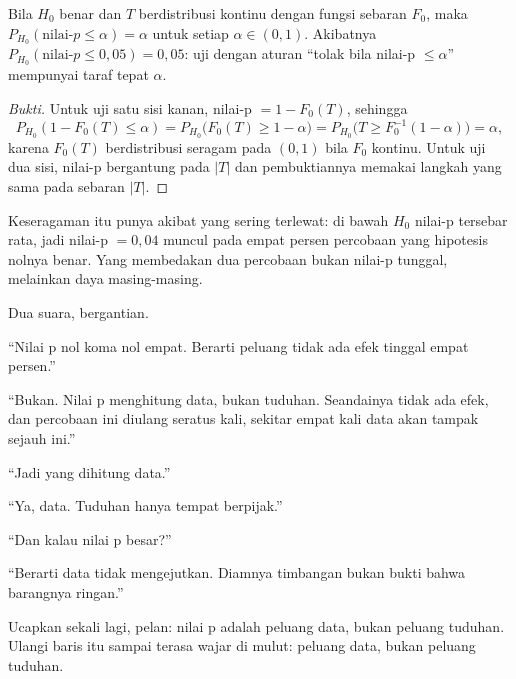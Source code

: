 \begin{teorema}
Bila $H_0$ benar dan $T$ berdistribusi kontinu dengan fungsi sebaran $F_0$, maka
$P_{H_0}(\text{nilai-}p\le\alpha)=\alpha$ untuk setiap $\alpha\in(0,1)$. Akibatnya
$P_{H_0}(\text{nilai-}p\le0{,}05)=0{,}05$: uji dengan aturan ``tolak bila nilai-p
$\le\alpha$'' mempunyai taraf tepat $\alpha$.
\end{teorema}

\begin{proof}[Bukti]
Untuk uji satu sisi kanan, nilai-p $=1-F_0(T)$, sehingga
\[
P_{H_0}(1-F_0(T)\le\alpha)
=P_{H_0}\bigl(F_0(T)\ge1-\alpha\bigr)
=P_{H_0}\bigl(T\ge F_0^{-1}(1-\alpha)\bigr)=\alpha,
\]
karena $F_0(T)$ berdistribusi seragam pada $(0,1)$ bila $F_0$ kontinu. Untuk uji dua
sisi, nilai-p bergantung pada $|T|$ dan pembuktiannya memakai langkah yang sama pada
sebaran $|T|$.
\end{proof}

Keseragaman itu punya akibat yang sering terlewat: di bawah $H_0$ nilai-p tersebar
rata, jadi nilai-p $=0{,}04$ muncul pada empat persen percobaan yang hipotesis nolnya
benar. Yang membedakan dua percobaan bukan nilai-p tunggal, melainkan daya
masing-masing.

\begin{bacakeras}
Dua suara, bergantian.

``Nilai p nol koma nol empat. Berarti peluang tidak ada efek tinggal empat persen.''

``Bukan. Nilai p menghitung data, bukan tuduhan. Seandainya tidak ada efek, dan
percobaan ini diulang seratus kali, sekitar empat kali data akan tampak sejauh ini.''

``Jadi yang dihitung data.''

``Ya, data. Tuduhan hanya tempat berpijak.''

``Dan kalau nilai p besar?''

``Berarti data tidak mengejutkan. Diamnya timbangan bukan bukti bahwa barangnya ringan.''

Ucapkan sekali lagi, pelan: nilai p adalah peluang data, bukan peluang tuduhan. Ulangi
baris itu sampai terasa wajar di mulut: peluang data, bukan peluang tuduhan.
\end{bacakeras}


